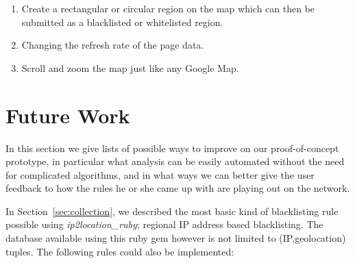 \documentclass[aps,preprint,amsmath,amssymb]{revtex4}
\begin{document}
\begin{enumerate}
\item Create a rectangular or circular region on the map which can then be submitted
as a blacklisted or whitelisted region.
\item Changing the refresh rate of the page data.
\item Scroll and zoom the map just like any Google Map.
\end{enumerate}


\section{Future Work}
\label{sec:future}

In this section we give lists of possible ways to improve on our proof-of-concept prototype,
in particular what analysis can be easily automated without the need for complicated
algorithms, and in what ways we can better give the user feedback to how the rules he or
she came up with are playing out on the network.

In Section~\ref{sec:collection}, we described the most basic kind of blacklisting rule
possible using \emph{ip2location\_ruby}; regional IP address based blacklisting. The
database available using this ruby gem however is not limited to (IP,geolocation) tuples.
The following rules could also be implemented:
\end{document}
